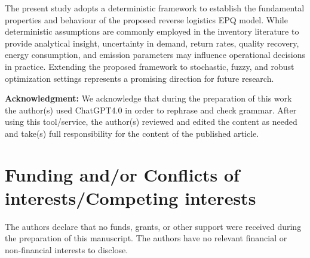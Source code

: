 \documentclass[11pt]{article}
\begin{document}
\noindent The present study adopts a deterministic framework to establish the fundamental properties and behaviour of the proposed reverse logistics EPQ model. While deterministic assumptions are commonly employed in the inventory literature to provide analytical insight, uncertainty in demand, return rates, quality recovery, energy consumption, and emission parameters may influence operational decisions in practice. Extending the proposed framework to stochastic, fuzzy, and robust optimization settings represents a promising direction for future research. 

\noindent \textbf{\large {Acknowledgment:}} 
\noindent We acknowledge that during the preparation of this work the author(s) used ChatGPT4.0 in order to rephrase and check grammar. After using this tool/service, the author(s) reviewed and edited the content as needed and take(s) full responsibility for the content of the published article.

\section{\small Funding and/or Conflicts of interests/Competing interests}
 The authors declare that no funds, grants, or other support were received during the preparation of this manuscript. The authors have no relevant financial or non-financial interests to disclose.
\end{document}
